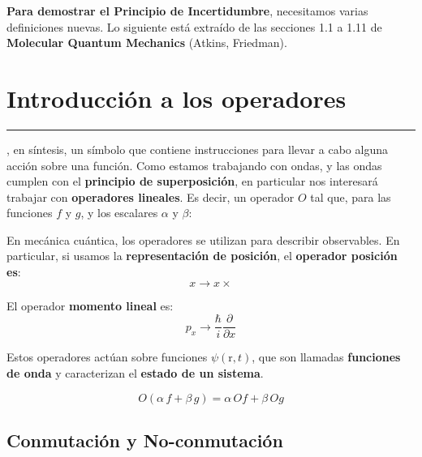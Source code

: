 \newpage
\begin{intro}{}
\textbf{Para demostrar el Principio de Incertidumbre}, necesitamos varias definiciones nuevas. Lo siguiente está extraído de las secciones 1.1 a 1.11 de \textbf{Molecular Quantum Mechanics} (Atkins, Friedman).
\end{intro}

\section{\huge{Introducción a los operadores}}

\textcolor{myred}{\hrule}

, en síntesis, un símbolo que contiene instrucciones para llevar a cabo alguna acción sobre una función. Como estamos trabajando con ondas, y las ondas cumplen con el \textbf{principio de superposición}, en particular nos interesará trabajar con \textbf{operadores lineales}. Es decir, un operador $O$ tal que, para las funciones $f$ y $g$, y los escalares $\alpha$ y $\beta$:

\begin{marginfigure}
\begin{qbox}{}
    En mecánica cuántica, los operadores se utilizan para describir observables. En particular, si usamos la \textbf{representación de posición}, el \textbf{operador posición es}:
    \begin{equation*}
        x \longrightarrow x \times
    \end{equation*}
    
    El operador \textbf{momento lineal} es:
    \begin{equation*}
        p_x \longrightarrow \frac{\hbar}{i}\frac{\partial}{\partial x}
    \end{equation*}
    
    Estos operadores actúan sobre funciones $\psi(\mathrm{r},t)$, que son llamadas \textbf{funciones de onda} y caracterizan el \textbf{estado de un sistema}.
\end{qbox}
\end{marginfigure}

\begin{equation}
    O(\alpha\,f+\beta\,g)=\alpha\, O f + \beta\, O g
\end{equation}

\subsection{\textbf{Conmutación y No-conmutación}}

